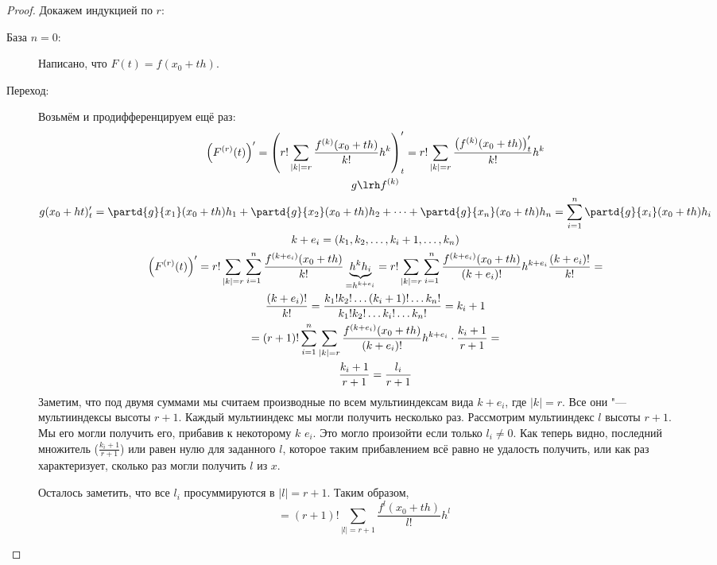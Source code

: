 \begin{proof}
	Докажем индукцией по $r$:
	\begin{description}
	\item[База $n = 0$:]
		Написано, что $F(t) = f(x_0 + th)$.
	\item[Переход:]
		Возьмём и продифференцируем ещё раз:
		\begin{gather*}
			\left(F^{(r)}(t)\right)' = \left(r! \sum_{|k| = r} \frac{f^{(k)}(x_0 + th)}{k!} h^k\right)'_t
				= r! \sum_{|k| = r} \frac{\left(f^{(k)}(x_0 + th)\right)'_t}{k!} h^k \\
			g \lrh f^{(k)} \\
			g(x_0+ht)'_t = \partd{g}{x_1}(x_0+th)h_1 + \partd{g}{x_2}(x_0+th)h_2 + \dots + \partd{g}{x_n}(x_0+th)h_n
				= \sum_{i=1}^n \partd{g}{x_i}(x_0+th) h_i \\
			k + e_i = (k_1, k_2, \dots, k_i + 1, \dots, k_n) \\
			\left(F^{(r)}(t)\right)' = r! \sum_{|k|=r} \sum_{i=1}^n \frac{f^{(k + e_i)} (x_0 + th)}{k!} \underbrace{h^k h_i}_{=h^{k + e_i}}
				= r! \sum_{|k|=r} \sum_{i=1}^n \frac{f^{(k + e_i)} (x_0 + th)}{(k+e_i)!} h^{k + e_i} \frac{(k+e_i)!}{k!} = \\
			\frac{(k+e_i)!}{k!} = \frac{k_1! k_2! \dots (k_i + 1)! \dots k_n!}{k_1! k_2! \dots k_i! \dots k_n!} = k_i + 1\\
			= (r+1)! \sum_{i=1}^n \sum_{|k|=r} \frac{f^{(k + e_i)} (x_0 + th)}{(k+e_i)!} h^{k + e_i} \cdot \frac{k_i + 1}{r + 1} = \\
			\frac{k_i + 1}{r + 1} = \frac{l_i}{r + 1}
		\end{gather*}
		Заметим, что под двумя суммами мы считаем производные по всем мультииндексам вида $k + e_i$, где $|k| = r$.
		Все они "--- мультииндексы высоты $r + 1$.
		Каждый мультииндекс мы могли получить несколько раз.
		Рассмотрим мультииндекс $l$ высоты $r + 1$.
		Мы его могли получить его, прибавив к некоторому $k$ $e_i$.
		Это могло произойти если только $l_i \ne 0$.
		Как теперь видно, последний множитель ($\frac{k_i + 1}{r + 1}$) или равен нулю для заданного $l$,
		которое таким прибавлением всё равно не удалость получить, или как раз характеризует, сколько раз могли получить $l$ из $x$.

		Осталось заметить, что все $l_i$ просуммируются в $|l| = r + 1$.
		Таким образом,
		\[ = (r+1)! \sum_{|l|=r + 1} \frac{f^{l} (x_0 + th)}{l!} h^l \]
	\end{description}
\end{proof}